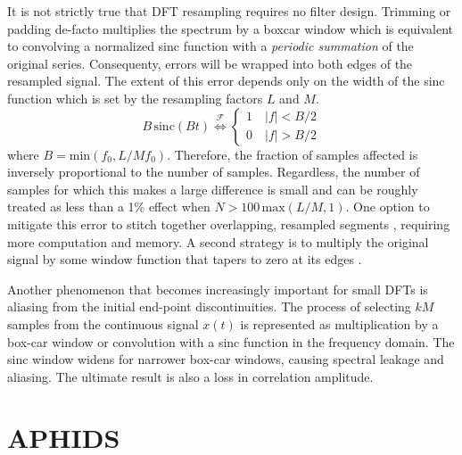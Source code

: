 \documentclass[11pt,preprint]{aastex}
\begin{document}
It is not strictly true that DFT resampling requires no filter design. Trimming or padding de-facto multiplies 
the spectrum by a boxcar window which is equivalent to convolving a normalized sinc function with a 
\emph{periodic summation} of the original series.
Consequenty, errors will be wrapped into both edges of the 
resampled signal.  The extent of this error 
depends only on the width of the sinc function which is set by the resampling factors $L$ and $M$.  
\begin{equation} \label{eq:sinc}
B\,\mathrm{sinc}(B t) \overset{\mathcal{F}}{\Longleftrightarrow} \begin{cases} 1 \quad |f| < B/2 \\ 0 \quad |f| > B/2 \end{cases}
\end{equation}
where $B = \mathrm{min}(f_0,L/Mf_0)$.  
Therefore, the fraction of samples affected is inversely proportional to the number of samples.  Regardless, the 
number of samples for which this makes a large difference is small and can be roughly treated as less than a 
1\% effect when $N > 100\,\mathrm{max}(L/M,1)$.  One option to mitigate this error to stitch together 
overlapping, resampled segments \citep{bi11}, requiring more computation and memory.  A second strategy is to 
multiply the original signal by some window function that tapers to zero at its edges \citep{fraser89}.

Another phenomenon that becomes increasingly important for small DFTs is aliasing from the initial end-point
discontinuities.  The process of selecting $kM$ samples from the continuous signal $x(t)$ is represented as 
multiplication by a box-car window or convolution with a sinc function in the frequency domain.  The sinc window
widens for narrower box-car windows, causing spectral leakage and aliasing.  The ultimate result is also a loss 
in correlation amplitude.

\section{APHIDS} \label{sec:aphids}
\end{document}
